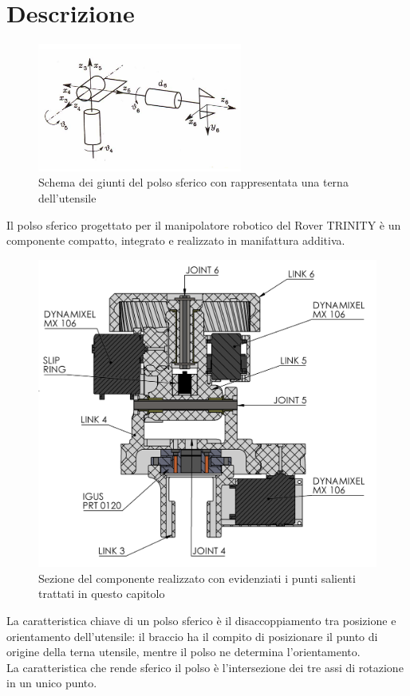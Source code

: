 \documentclass[%
corpo=11pt,
twoside,
 stile=classica,
oldstyle,
greek,%
]{toptesi}
\begin{document}
	\section{Descrizione}
	\begin{figure}
		\centering
		\includegraphics[width=0.6\textwidth]{image/sferico.png}
		\caption{Schema dei giunti del polso sferico con rappresentata una terna dell'utensile}
		\label{fig:sferico}
	\end{figure}
	Il polso sferico progettato per il manipolatore robotico del Rover TRINITY è un componente compatto, integrato e realizzato in manifattura additiva. 
	\begin{figure}
		\centering
		\includegraphics[width=1.2\textwidth]{Screen/wristsection.png}
		\caption{Sezione del componente realizzato con evidenziati i punti salienti trattati in questo capitolo}
		\label{fig:disegnosferico}
	\end{figure} 
	La caratteristica chiave di un polso sferico è il disaccoppiamento tra posizione e orientamento dell'utensile: il braccio ha il compito di posizionare il punto di origine della terna utensile, mentre il polso ne determina l'orientamento.\\
	La caratteristica che rende sferico il polso è l'intersezione dei tre assi di rotazione in un unico punto.
	
\end{document}
